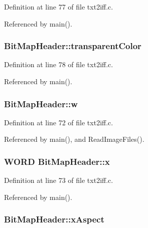 Definition at line 77 of file txt2iff.\+c.



Referenced by main().

\hypertarget{structBitMapHeader_acb7a029e55d56f59ac0bc3311dca7a1d}{
\subsubsection[{transparent\+Color}]{ Bit\+Map\+Header\+::transparent\+Color}}\label{structBitMapHeader_acb7a029e55d56f59ac0bc3311dca7a1d}


Definition at line 78 of file txt2iff.\+c.



Referenced by main().

\hypertarget{structBitMapHeader_addb60a981d49eed2185521b722fda07a}{
\subsubsection[{w}]{ Bit\+Map\+Header\+::w}}\label{structBitMapHeader_addb60a981d49eed2185521b722fda07a}


Definition at line 72 of file txt2iff.\+c.



Referenced by main(), and Read\+Image\+Files().

\hypertarget{structBitMapHeader_a8e6de2b624a77aee2695f35f1b340645}{
\subsubsection[{x}]{\setlength{\rightskip}{0pt plus 5cm}W\+O\+R\+D Bit\+Map\+Header\+::x}}\label{structBitMapHeader_a8e6de2b624a77aee2695f35f1b340645}


Definition at line 73 of file txt2iff.\+c.



Referenced by main().

\hypertarget{structBitMapHeader_a6e885e5664ff89d1691333cf0c4a6327}{
\subsubsection[{x\+Aspect}]{ Bit\+Map\+Header\+::x\+Aspect}}\label{structBitMapHeader_a6e885e5664ff89d1691333cf0c4a6327}


